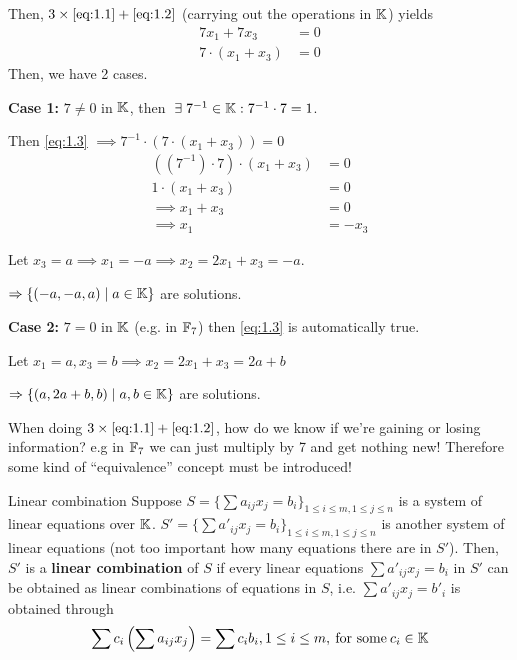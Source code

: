 \begin{explanation}
    Then, \(3 \times\eqref{eq:1.1} +\eqref{eq:1.2}\) (carrying out the operations in \(\mathbb{K}\)) yields
    \begin{equation} \label{eq:1.3}
        \begin{split}
            7x_1 + 7x_3 &= 0 \\
            7 \cdot (x_1 + x_3) &= 0
        \end{split}
    \end{equation}
    Then, we have 2 cases.

    \textbf{Case 1:} \(7 \neq 0\) in \(\mathbb{K}\), then \(\exists 7^{-1} \in \bbk: 7^{-1}\cdot 7 = 1\).

    Then \eqref{eq:1.3} \(\implies 7^{-1} \cdot (7 \cdot (x_1+x_3)) = 0\)
    \begin{align*}
        ((7^{-1})\cdot 7) \cdot (x_1 + x_3) & = 0    \\
        1 \cdot (x_1 + x_3)                 & = 0    \\
        \implies x_1 + x_3                  & = 0    \\
        \implies x_1                        & = -x_3
    \end{align*}

    Let \(x_3=a \implies x_1 = -a \implies x_2 = 2x_1 + x_3 = -a\).

    \(\Rightarrow \{(-a, -a, a) \mid a \in \mathbb{K}\}\) are solutions.

    \hfill

    \textbf{Case 2:} \(7 = 0 \) in \(\mathbb{K}\) (e.g. in \(\mathbb{F}_7\)) then \eqref{eq:1.3} is automatically true.

    Let \(x_1 = a, x_3 = b \implies x_2 = 2x_1 + x_3= 2a+b\)

    \(\Rightarrow \{(a, 2a+b, b) \mid a, b \in \mathbb{K}\}\) are solutions.
\end{explanation}

\begin{remark}
    When doing \(3 \times \eqref{eq:1.1} + \eqref{eq:1.2}\), how do we know if we're gaining or losing information? e.g in \(\mathbb{F}_7\) we can just multiply by 7 and get nothing new! Therefore some kind of ``equivalence'' concept must be introduced!
\end{remark}

\begin{definition} {Linear combination}
    Suppose \(S = \{\sum a_{ij}x_j = b_i\}_{1 \leq i \leq m, 1\leq j \leq n}\) is a system of linear equations over \(\mathbb{K}\). \(S' = \{\sum a'_{ij}x_j = b_i\}_{1 \leq i \leq m, 1\leq j \leq n}\) is another system of linear equations (not too important how many equations there are in \(S'\)). Then, \(S'\) is a \textbf{linear combination} of \(S\) if every linear equations \(\sum a'_{ij}x_j = b_i\) in \(S'\) can be obtained as linear combinations of equations in \(S\), i.e. \(\sum a'_{ij}x_j = b'_i\) is obtained through \[
        \sum c_i\left(\sum a_{ij}x_j\right) = \sum c_i b_i, 1 \leq i \leq m,\:\text{for some}\: c_i \in \mathbb{K}
    \]
\end{definition}

